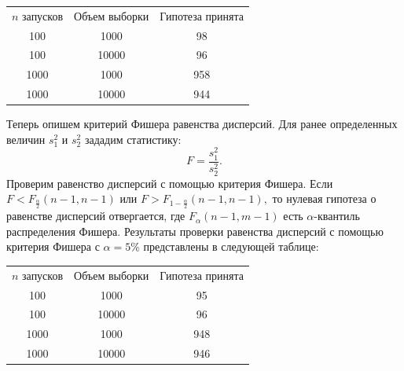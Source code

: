 \documentclass[11pt]{article}
\begin{document}
\begin{center}
\begin{tabular}{|c|c|c|}
\hline
$n$ запусков &Объем выборки & Гипотеза принята \\
100 & 1000 & 98 \\
100 & 10000 & 96 \\
1000& 1000 & 958 \\
1000& 10000 & 944 \\
\hline
\end{tabular}
\end{center}
Теперь опишем критерий Фишера равенства дисперсий. Для ранее определенных величин $s_1^2$ и $s_2^2$ зададим статистику:
\[ F = \frac{s_1^2}{s_2^2}. \]
Проверим равенство дисперсий с помощью критерия Фишера. Если $F < F_{\frac{\alpha}{2}}(n - 1, n -1)$ или $F > F_{1 - \frac{\alpha}{2}}(n-1, n-1),$ то нулевая гипотеза о равенстве дисперсий отвергается, где $F_\alpha(n-1,m-1)$ есть $\alpha$-квантиль распределения Фишера.
\newline
Результаты проверки равенства дисперсий с помощью критерия Фишера с  $\alpha = 5$\% представлены в следующей таблице:
\begin{center}
	\begin{tabular}{|c|c|c|}
		\hline
		$n$ запусков &Объем выборки & Гипотеза принята \\
		100 & 1000 & 95 \\
		100 & 10000 & 96 \\
		1000& 1000 & 948 \\
		1000& 10000 & 946 \\
		\hline
	\end{tabular}
\end{center}
\end{document}

